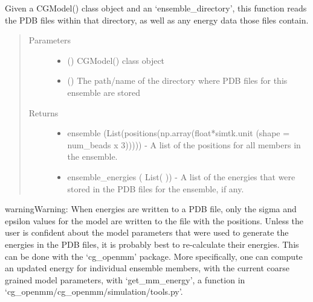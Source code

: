 \documentclass[letterpaper,12pt,english,openany,oneside]{sphinxmanual}
\begin{document}
\begin{fulllineitems}
\label{\detokenize{ensembles:ensembles.ens_build.get_ensemble_data}}
Given a CGModel() class object and an ‘ensemble\_directory’, this function reads the PDB files within that directory, as well as any energy data those files contain.
\begin{quote}\begin{description}
\item[{Parameters}] \leavevmode\begin{itemize}
\item {} 
 () \textendash{} CGModel() class object

\item {} 
 () \textendash{} The path/name of the directory where PDB files for this ensemble are stored

\end{itemize}

\item[{Returns}] \leavevmode
\begin{itemize}
\item {} 
ensemble (List(positions(np.array(float*simtk.unit (shape = num\_beads x 3))))) - A list of the positions for all members in the ensemble.

\item {} 
ensemble\_energies ( List( )) - A list of the energies that were stored in the PDB files for the ensemble, if any.

\end{itemize}


\end{description}\end{quote}

\begin{sphinxadmonition}{warning}{Warning:}
When energies are written to a PDB file, only the sigma and epsilon values for the model are written to the file with the positions.  Unless the user is confident about the model parameters that were used to generate the energies in the PDB files, it is probably best to re-calculate their energies.  This can be done with the ‘cg\_openmm’ package.  More specifically, one can compute an updated energy for individual ensemble members, with the current coarse grained model parameters, with ‘get\_mm\_energy’, a function in ‘cg\_openmm/cg\_openmm/simulation/tools.py’.
\end{sphinxadmonition}

\end{fulllineitems}
\end{document}

